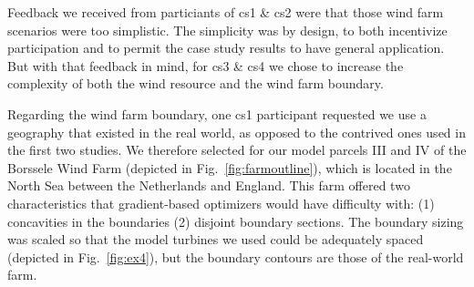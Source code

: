 
Feedback we received from particiants of cs1 \& cs2 were that those wind farm scenarios were too simplistic.
The simplicity was by design, to both incentivize participation and to permit the case study results to have general application.
But with that feedback in mind, for cs3 \& cs4 we chose to increase the complexity of both the wind resource and the wind farm boundary.

Regarding the wind farm boundary, one cs1 participant requested we use a geography that existed in the real world, as opposed to the contrived ones used in the first two studies.
We therefore selected for our model parcels III and IV of the Borssele Wind Farm (depicted in Fig.~\ref{fig:farmoutline}), which is located in the North Sea between the Netherlands and England.
This farm offered two characteristics that gradient-based optimizers would have difficulty with: (1) concavities in the boundaries (2) disjoint boundary sections.
The boundary sizing was scaled so that the model turbines we used could be adequately spaced (depicted in Fig.~\ref{fig:ex4}), but the boundary contours are those of the real-world farm.

